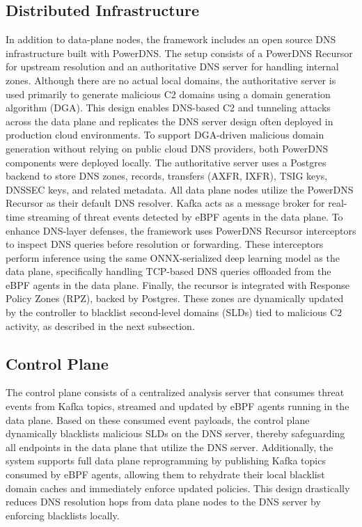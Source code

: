 \documentclass [11pt, proquest] {uwthesis}[2020/02/24]
\begin{document}
\subsection{Distributed Infrastructure}
In addition to data-plane nodes, the framework includes an open source DNS infrastructure built with PowerDNS. The setup consists of a PowerDNS Recursor for upstream resolution and an authoritative DNS server for handling internal zones. Although there are no actual local domains, the authoritative server is used primarily to generate malicious C2 domains using a domain generation algorithm (DGA). This design enables DNS-based C2 and tunneling attacks across the data plane and replicates the DNS server design often deployed in production cloud environments. To support DGA-driven malicious domain generation without relying on public cloud DNS providers, both PowerDNS components were deployed locally. The authoritative server uses a Postgres backend to store DNS zones, records, transfers (AXFR, IXFR), TSIG keys, DNSSEC keys, and related metadata. All data plane nodes utilize the PowerDNS Recursor as their default DNS resolver. Kafka acts as a message broker for real-time streaming of threat events detected by eBPF agents in the data plane. To enhance DNS-layer defenses, the framework uses PowerDNS Recursor interceptors to inspect DNS queries before resolution or forwarding. These interceptors perform inference using the same ONNX-serialized deep learning model as the data plane, specifically handling TCP-based DNS queries offloaded from the eBPF agents in the data plane. Finally, the recursor is integrated with Response Policy Zones (RPZ), backed by Postgres. These zones are dynamically updated by the controller to blacklist second-level domains (SLDs) tied to malicious C2 activity, as described in the next subsection.

\subsection{Control Plane}
The control plane consists of a centralized analysis server that consumes threat events from Kafka topics, streamed and updated by eBPF agents running in the data plane. Based on these consumed event payloads, the control plane dynamically blacklists malicious SLDs on the DNS server, thereby safeguarding all endpoints in the data plane that utilize the DNS server. Additionally, the system supports full data plane reprogramming by publishing Kafka topics consumed by eBPF agents, allowing them to rehydrate their local blacklist domain caches and immediately enforce updated policies. This design drastically reduces DNS resolution hops from data plane nodes to the DNS server by enforcing blacklists locally.
\end{document}

